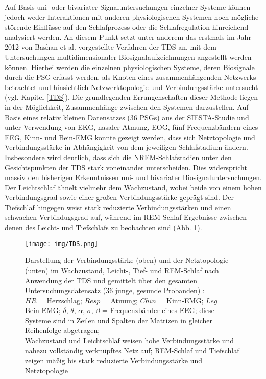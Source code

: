 Auf Basis uni- oder bivariater Signaluntersuchungen einzelner Systeme können jedoch weder Interaktionen mit anderen physiologischen Systemen noch mögliche störende Einflüsse auf den Schlafprozess oder die Schlafregulation hinreichend analysiert werden. An diesem Punkt setzt unter anderem das erstmals im Jahr 2012 von Bashan et al. vorgestellte Verfahren der \acs{TDS} an, mit dem Untersuchungen multidimensionaler Biosignalaufzeichnungen angestellt werden können. Hierbei werden die einzelnen physiologischen Systeme, deren Biosignale durch die \acs{PSG} erfasst werden, als Knoten eines zusammenhängenden Netzwerks betrachtet und hinsichtlich Netzwerktopologie und Verbindungsstärke untersucht (vgl. Kapitel \ref{TDS}). Die grundlegenden Errungenschaften dieser Methode liegen in der Möglichkeit, Zusammenhänge zwischen den Systemen darzustellen. Auf Basis eines relativ kleinen Datensatzes (36 \acs{PSG}s) aus der SIESTA-Studie\parencite{klosch_siesta_2001} und unter Verwendung von \acs{EKG}, nasaler Atmung, \acs{EOG}, fünf Frequenzbändern eines \acs{EEG}, Kinn- und Bein-\acs{EMG} konnte gezeigt werden, dass sich Netztopologie und Verbindungsstärke in Abhängigkeit von dem jeweiligen Schlafstadium ändern. Insbesondere wird deutlich, dass sich die \acs{NREM}-Schlafstadien unter den Gesichtspunkten der \acs{TDS} stark voneinander unterscheiden. Dies widerspricht massiv den bisherigen Erkenntnissen uni- und bivariater Biosignaluntersuchungen. Der Leichtschlaf ähnelt vielmehr dem Wachzustand, wobei beide von einem hohen Verbindungsgrad sowie einer großen Verbindungsstärke geprägt sind. Der Tiefschlaf hingegen weist stark reduzierte Verbindungsstärken und einen schwachen Verbindugsgrad auf, während im \acs{REM}-Schlaf Ergebnisse zwischen denen des Leicht- und Tiefschlafs zu beobachten sind (Abb. \ref{fig:TDS}). \parencite{bashan_network_2012}

\begin{figure}[H]
	\centering
	\texttt{[image: img/TDS.png]}
	\caption[Verbindungsstärke und Netztopologie im \acs{TDS}-Verfahren]{Darstellung der Verbindungsstärke (oben) und der Netztopologie (unten) im Wachzustand, Leicht-, Tief- und \acs{REM}-Schlaf nach Anwendung der \acs{TDS} und gemittelt über den gesamten Untersuchungsdatensatz (36 junge, gesunde Probanden) \parencite{bashan_network_2012}:\\$HR$ = Herzschlag; $Resp$ = Atmung; $Chin$ = Kinn-\acs{EMG}; $Leg$ = Bein-\acs{EMG}; $\delta$, $\theta$, $\alpha$, $\sigma$, $\beta$ = Frequenzbänder eines \acs{EEG}; diese Systeme sind in Zeilen und Spalten der Matrizen in gleicher Reihenfolge abgetragen;\\Wachzustand und Leichtschlaf weisen hohe Verbindungsstärke und nahezu vollständig verknüpftes Netz auf; \acs{REM}-Schlaf und Tiefschlaf zeigen mäßig bis stark reduzierte Verbindungsstärke und Netztopologie\\}
	\label{fig:TDS}
\end{figure}

